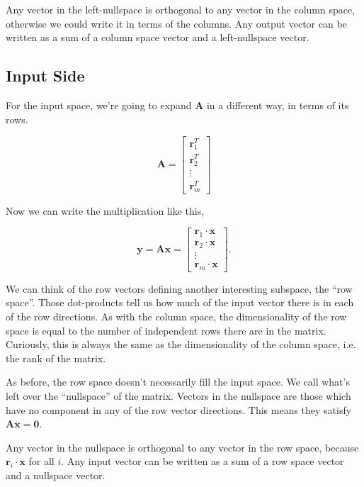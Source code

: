 \documentclass[a4paper,10pt]{article}
\newcommand{\mA}{$\mathbf{A}$ }
\begin{document}
Any vector in the left-nullspace is orthogonal to any vector in the column space, otherwise we could write it in terms of the columns. Any output vector can be written as a sum of a column space vector and a left-nullspace vector.

\subsection{Input Side}

For the input space, we're going to expand \mA in a different way, in terms of its rows.

\begin{equation}
 \mathbf{A} = \begin{bmatrix}\mathbf{r}_1^T \\ \mathbf{r}_2^T \\ \vdots \\ \mathbf{r}_m^T \end{bmatrix}
\end{equation}

Now we can write the multiplication like this,

\begin{equation}
 \mathbf{y} = \mathbf{A x} = \begin{bmatrix} \mathbf{r}_1 \cdot \mathbf{x} \\ \mathbf{r}_2 \cdot \mathbf{x} \\ \vdots \\ \mathbf{r}_m \cdot \mathbf{x} \end{bmatrix}    .
\end{equation}

We can think of the row vectors defining another interesting subspace, the ``row space''. Those dot-products tell us how much of the input vector there is in each of the row directions. As with the column space, the dimensionality of the row space is equal to the number of independent rows there are in the matrix. Curiously, this is always the same as the dimensionality of the column space, i.e. the rank of the matrix.

As before, the row space doesn't necessarily fill the input space. We call what's left over the ``nullspace'' of the matrix. Vectors in the nullspace are those which have no component in any of the row vector directions. This means they satisfy $\mathbf{A x} = \mathbf{0}$.

Any vector in the nullspace is orthogonal to any vector in the row space, because $\mathbf{r}_i \cdot \mathbf{x}$ for all $i$. Any input vector can be written as a sum of a row space vector and a nullspace vector.
\end{document}
